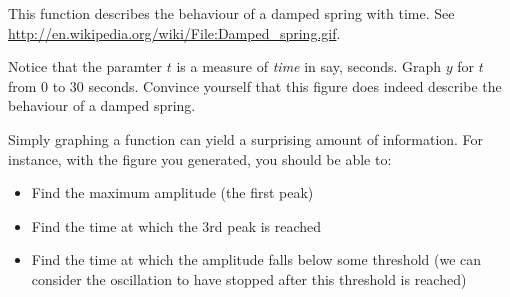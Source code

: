 \documentclass{article}
\begin{document}
This function describes the behaviour of a damped spring with time.
See \url{http://en.wikipedia.org/wiki/File:Damped_spring.gif}. 

Notice that the paramter $t$ is a measure of \emph{time} in say, seconds. 
Graph $y$ for $t$ from 0 to 30 seconds. Convince yourself that this figure 
does indeed describe the behaviour of a damped spring.

Simply graphing a function can yield a surprising amount of information.
For instance, with the figure you generated, you should be able to:


\begin{itemize}
\item{Find the maximum amplitude (the first peak)}
\item{Find the time at which the 3rd peak is reached}
\item{Find the time at which the amplitude falls below some threshold 
(we can consider the oscillation to have stopped after this threshold is
reached)}

\end{itemize}
\end{document}
